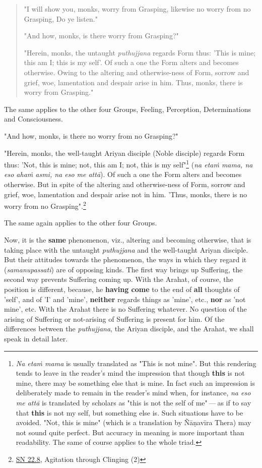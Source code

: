 \begin{quote}
"I will show you, monks, worry from Grasping, likewise no worry from no Grasping, Do ye listen."

"And how, monks, is there worry from Grasping?"

"Herein, monks, the untaught \emph{puthujjana} regards Form thus: 'This is mine; this am I; this is my self'. Of such a one the Form alters and becomes otherwise. Owing to the altering and otherwise-ness of Form, sorrow and grief, woe, lamentation and despair arise in him. Thus, monks, there is worry from Grasping."
\end{quote}

The same applies to the other four Groups, Feeling, Perception, Determinations and Consciousness.

"And how, monks, is there no worry from no Grasping?"

"Herein, monks, the well-taught Ariyan disciple (Noble disciple) regards Form thus: 'Not, this is mine; not, this am I; not, this is my self"\footnote{\emph{Na etaṁ mama} is usually translated as "This is not mine". But this rendering tends to leave in the reader's mind the impression that though \textbf{this} is not mine, there may be something else that is mine. In fact such an impression is deliberately made to remain in the reader's mind when, for instance, \emph{na eso me attā} is translated by scholars as "this is not the self of me" --- as if to say that \textbf{this} is not my self, but something else is. Such situations have to be avoided. "Not, this is mine" (which is a translation by Ñāṇavīra Thera) may not sound quite perfect. But accuracy in meaning is more important than readability. The same of course applies to the whole triad.} (\emph{na etaṁ mama, na eso ahaṁ asmi, na eso me attā}). Of such a one the Form alters and becomes otherwise. But in spite of the altering and otherwise-ness of Form, sorrow and grief, woe, lamentation and despair arise not in him. 'Thus, monks, there is no worry from no Grasping".\footnote{\href{https://suttacentral.net/sn22.8/en/bodhi}{SN 22.8}, Agitation through Clinging (2)}

The same again applies to the other four Groups.

Now, it is the \textbf{same} phenomenon, viz., altering and becoming otherwise, that is taking place with the untaught \emph{puthujjana} and the well-taught Ariyan disciple. But their attitudes towards the phenomenon, the ways in which they regard it (\emph{samanupassati}) are of opposing kinds. The first way brings up Suffering, the second way prevents Suffering coming up. With the Arahat, of course, the position is different, because, he \textbf{having come} to the end of \textbf{all} thoughts of 'self', and of 'I' and 'mine', \textbf{neither} regards things as 'mine', etc., \textbf{nor} as 'not mine', etc. With the Arahat there is no Suffering whatever. No question of the arising of Suffering or not-arising of Suffering is present for him. Of the differences between the \emph{puthujjana}, the Ariyan disciple, and the Arahat, we shall speak in detail later.

